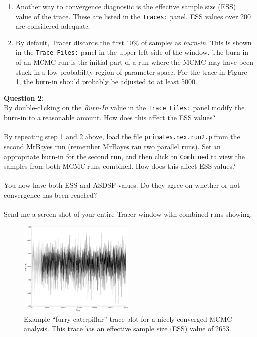 \documentclass[11pt]{article}
\begin{document}
\begin{enumerate}
\item Another way to convergence diagnostic is the effective sample size (ESS) 
value of the trace. These are listed in the \texttt{Traces:} panel.
ESS values over 200 are considered adequate.

\item By default, Tracer discards the first 10\% of samples as \textit{burn-in}.
This is shown in the \texttt{Trace Files:} panel in the upper left side of the window.
The burn-in of an MCMC run is the initial part of a run where the MCMC
may have been stuck in a low probability region of parameter space.
For the trace in Figure 1, the burn-in should probably be 
adjusted to at least 5000.

\end{enumerate}

\begin{framed}
\noindent
\textbf{Question 2:} \\
By double-clicking on the \textit{Burn-In} value in the \texttt{Trace Files:} panel
modify the burn-in to a reasonable amount. 
How does this affect the ESS values? \\
\\
By repeating step 1 and 2 above, load the file \texttt{primates.nex.run2.p} 
from the second MrBayes run 
(remember MrBayes ran two parallel runs).
Set an appropriate burn-in for the second run,
and then click on \texttt{Combined} to view the samples from both MCMC runs combined.
How does this affect ESS values? \\
\\
You now have both ESS and ASDSF values. Do they agree on whether or not convergence has been reached? \\
\\
Send me a screen shot of your entire Tracer window with combined runs showing.
\end{framed}

\begin{figure}
\centering
\includegraphics[width=0.5\textwidth]{log.pdf}
\caption{Example ``furry caterpillar'' trace plot for a nicely converged MCMC analysis.
This trace has an effective sample size (ESS) value of 2653.}
\end{figure}
\end{document}
